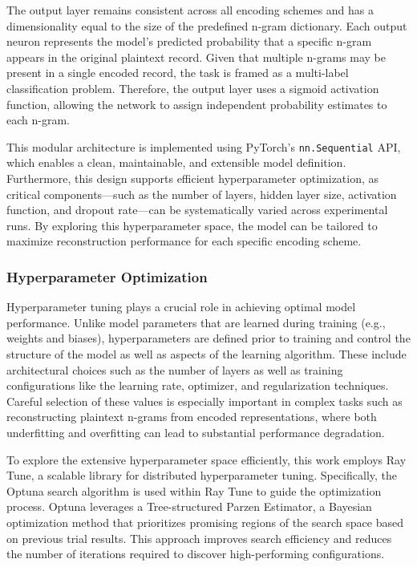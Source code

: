 The output layer remains consistent across all encoding schemes and has a dimensionality equal to the size of the predefined n-gram dictionary.
Each output neuron represents the model's predicted probability that a specific n-gram appears in the original plaintext record.
Given that multiple n-grams may be present in a single encoded record, the task is framed as a multi-label classification problem.
Therefore, the output layer uses a sigmoid activation function, allowing the network to assign independent probability estimates to each n-gram.

This modular architecture is implemented using PyTorch's \texttt{nn.Sequential} API, which enables a clean, maintainable, and extensible model definition.
Furthermore, this design supports efficient hyperparameter optimization, as critical components—such as the number of layers, hidden layer size, activation function, and dropout rate—can be systematically varied across experimental runs.
By exploring this hyperparameter space, the model can be tailored to maximize reconstruction performance for each specific encoding scheme.


\subsubsection{Hyperparameter Optimization}

Hyperparameter tuning plays a crucial role in achieving optimal model performance.
Unlike model parameters that are learned during training (e.g., weights and biases), hyperparameters are defined prior to training and control the structure of the model as well as aspects of the learning algorithm.
These include architectural choices such as the number of layers as well as training configurations like the learning rate, optimizer, and regularization techniques.
Careful selection of these values is especially important in complex tasks such as reconstructing plaintext n-grams from encoded representations, where both underfitting and overfitting can lead to substantial performance degradation.

To explore the extensive hyperparameter space efficiently, this work employs Ray Tune, a scalable library for distributed hyperparameter tuning.
Specifically, the Optuna search algorithm is used within Ray Tune to guide the optimization process.
Optuna leverages a Tree-structured Parzen Estimator, a Bayesian optimization method that prioritizes promising regions of the search space based on previous trial results.
This approach improves search efficiency and reduces the number of iterations required to discover high-performing configurations.

